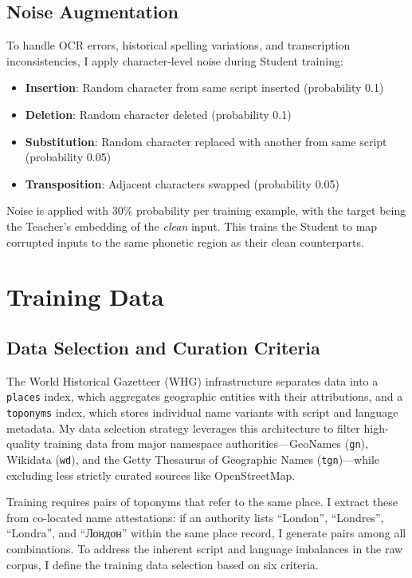 \documentclass[11pt,a4paper]{article}
\begin{document}
\subsection{Noise Augmentation}

To handle OCR errors, historical spelling variations, and transcription inconsistencies, I apply character-level noise during Student training:

\begin{itemize}
    \item \textbf{Insertion}: Random character from same script inserted (probability 0.1)
    \item \textbf{Deletion}: Random character deleted (probability 0.1)
    \item \textbf{Substitution}: Random character replaced with another from same script (probability 0.05)
    \item \textbf{Transposition}: Adjacent characters swapped (probability 0.05)
\end{itemize}

Noise is applied with 30\% probability per training example, with the target being the Teacher's embedding of the \emph{clean} input. This trains the Student to map corrupted inputs to the same phonetic region as their clean counterparts.


\section{Training Data}
\label{sec:data}

\subsection{Data Selection and Curation Criteria}
\label{subsec:selection_criteria}

The World Historical Gazetteer (WHG) infrastructure separates data into a \texttt{places} index, which aggregates geographic entities with their attributions, and a \texttt{toponyms} index, which stores individual name variants with script and language metadata. My data selection strategy leverages this architecture to filter high-quality training data from major namespace authorities---GeoNames (\texttt{gn}), Wikidata (\texttt{wd}), and the Getty Thesaurus of Geographic Names (\texttt{tgn})---while excluding less strictly curated sources like OpenStreetMap.

Training requires pairs of toponyms that refer to the same place. I extract these from co-located name attestations: if an authority lists ``London'', ``Londres'', ``Londra'', and ``Лондон'' within the same place record, I generate pairs among all combinations. To address the inherent script and language imbalances in the raw corpus, I define the training data selection based on six criteria.
\end{document}
